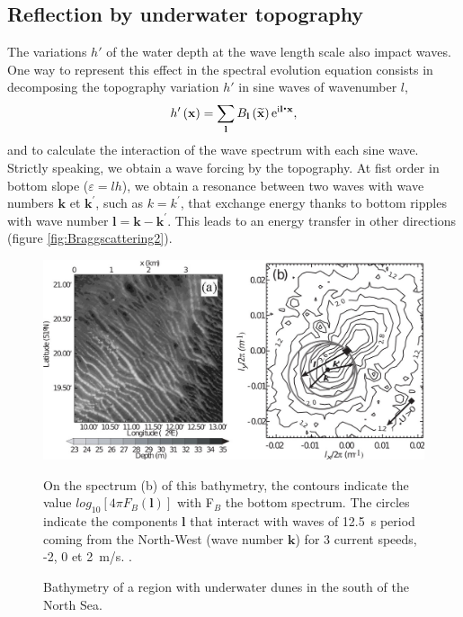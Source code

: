 \subsection{Reflection by underwater topography}

The variations $h'$ of the water depth at the wave length scale also impact waves.
One way to represent this effect in the spectral evolution equation consists in
decomposing the topography variation $h'$ in sine waves of wavenumber $l$,
\begin{equation}
h'\left({\mathbf x}\right) =\sum_{{\mathbf l}}
B_{{\mathbf l}}\left( \widetilde{\mathbf x}\right)
\mathrm{e}^{\mathrm{i}{\mathbf l}\mbox{\boldmath $\cdot$}{\mathbf x}},  \label{h}
\end{equation}
and to calculate the interaction of the wave spectrum with each sine wave.
Strictly speaking, we obtain a wave forcing by the topography. %
At fist order in bottom slope ($\varepsilon = lh$), we obtain a resonance between
two waves with wave numbers ${\mathbf k}$ et ${\mathbf k}^{\prime }$, such as
$k=k^\prime$, that exchange energy thanks to bottom ripples with wave number
${\mathbf l}={\mathbf k}-{\mathbf k}^{\prime}$. This leads to an energy transfer
in other directions (figure \ref{fig:Braggscattering2}).


\begin{figure}[htb]
\centerline{\includegraphics[width=\textwidth]{FIGS_CH_SHALLOWLIN/figure_whitepaper72.jpg}}
  \caption{Bathymetry of a region with underwater dunes in the south of the North Sea.}{On the
  spectrum (b) of this bathymetry, the contours indicate the value  $log_{10}[4\pi F_B({\mathbf l})]$
  with F$_B$ the bottom spectrum. The circles indicate the components ${\mathbf l}$ that interact
  with waves of 12.5~s period coming from the North-West (wave number ${\mathbf k}$) for 3 current
  speeds, -2, 0 et 2~m/s. .}\label{fig:Braggscattering1}
\end{figure}

